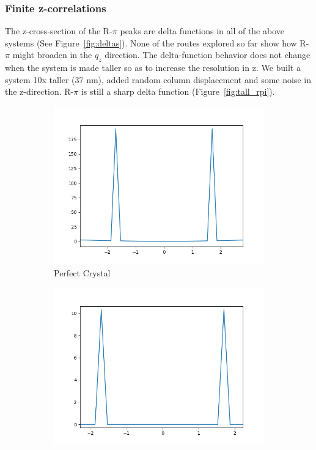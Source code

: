 \documentclass{article}
\begin{document}
  \subsubsection{Finite z-correlations}

  The z-cross-section of the R-$\pi$ peaks are delta functions in all of the
  above systems (See Figure~\ref{fig:deltas}). None of the routes explored so far
  show how R-$\pi$ might broaden in the $q_z$ direction. The delta-function
  behavior does not change when the system is made taller so as to increase the
  resolution in z. We built a system 10x taller (37 nm), added random column
  displacement and some noise in the z-direction. R-$\pi$ is still a sharp delta
  function (Figure~\ref{fig:tall_rpi}). 

  \begin{figure}
  \centering
  \begin{subfigure}{0.45\textwidth}
  \includegraphics[width=\textwidth]{perfect_rpi.png}
  \caption{Perfect Crystal}\label{fig:perfect_rpi}
  \end{subfigure}
  \begin{subfigure}{0.45\textwidth}
  \includegraphics[width=\textwidth]{displace_columns_rpi.png}

\end{subfigure}
\end{figure}
\end{document}
